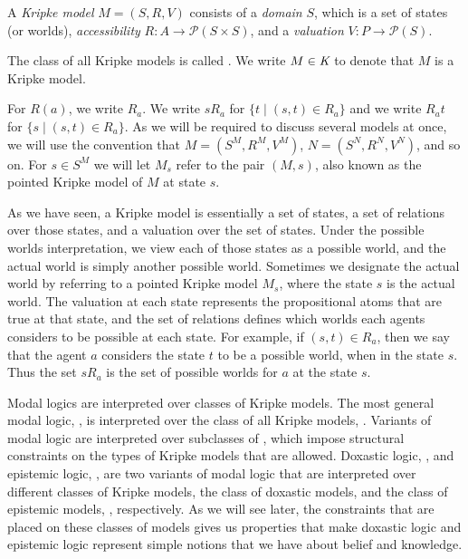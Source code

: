 \begin{definition}
A \textit{Kripke model} $M = (S, R, V)$ consists of a \textit{domain} $S$, which
is a set of states (or worlds), \textit{accessibility} $R : A \to \mathcal{P}(S
\times S)$, and a \textit{valuation} $V : P \to \mathcal{P}(S)$. 

The class of all Kripke models is called \classK{}. We write $M \in \textit{K}{}$
to denote that $M$ is a Kripke model.
\end{definition}

For $R(a)$, we write $R_a$. We write $sR_a$ for $\{t \mid (s, t) \in R_a\}$ and
we write $R_at$ for $\{s \mid (s, t) \in R_a\}$. As we will be required to
discuss several models at once, we will use the convention that $M = (S^M, R^M,
V^M)$, $N = (S^N, R^N, V^N)$, and so on. For $s \in S^M$ we will let $M_s$ refer
to the pair $(M, s)$, also known as the pointed Kripke model of $M$ at state
$s$.

As we have seen, a Kripke model is essentially a set of states, a set of
relations over those states, and a valuation over the set of states. Under the
possible worlds interpretation, we view each of those states as a possible
world, and the actual world is simply another possible world. Sometimes we
designate the actual world by referring to a pointed Kripke model $M_s$, where
the state $s$ is the actual world. The valuation at each state represents the
propositional atoms that are true at that state, and the set of relations
defines which worlds each agents considers to be possible at each state. For
example, if $(s, t) \in R_a$, then we say that the agent $a$ considers the state
$t$ to be a possible world, when in the state $s$. Thus the set $sR_a$ is the
set of possible worlds for $a$ at the state $s$.

Modal logics are interpreted over classes of Kripke models. The most general
modal logic, \logicK{}, is interpreted over the class of all Kripke models,
\classK{}. Variants of modal logic are interpreted over subclasses of \classK{},
which impose structural constraints on the types of Kripke models that are
allowed. Doxastic logic, \logicKD{}, and epistemic logic, \logicS{}, are two
variants of modal logic that are interpreted over different classes of Kripke
models, the class of doxastic models, \classKD{} and the class of epistemic
models, \classS{}, respectively. As we will see later, the constraints that are
placed on these classes of models gives us properties that make doxastic logic
and epistemic logic represent simple notions that we have about belief and
knowledge.

